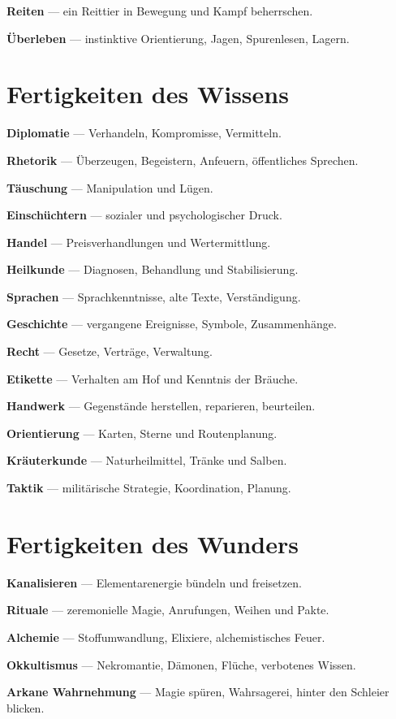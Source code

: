 \documentclass[10pt,a4paper]{article}
\begin{document}
\textbf{Reiten} — ein Reittier in Bewegung und Kampf beherrschen.

\textbf{Überleben} — instinktive Orientierung, Jagen, Spurenlesen, Lagern.

\section*{Fertigkeiten des Wissens}
\textbf{Diplomatie} — Verhandeln, Kompromisse, Vermitteln.

\textbf{Rhetorik} — Überzeugen, Begeistern, Anfeuern, öffentliches Sprechen.

\textbf{Täuschung} — Manipulation und Lügen.

\textbf{Einschüchtern} — sozialer und psychologischer Druck.

\textbf{Handel} — Preisverhandlungen und Wertermittlung.

\textbf{Heilkunde} — Diagnosen, Behandlung und Stabilisierung.

\textbf{Sprachen} — Sprachkenntnisse, alte Texte, Verständigung.

\textbf{Geschichte} — vergangene Ereignisse, Symbole, Zusammenhänge.

\textbf{Recht} — Gesetze, Verträge, Verwaltung.

\textbf{Etikette} — Verhalten am Hof und Kenntnis der Bräuche.

\textbf{Handwerk} — Gegenstände herstellen, reparieren, beurteilen.

\textbf{Orientierung} — Karten, Sterne und Routenplanung.

\textbf{Kräuterkunde} — Naturheilmittel, Tränke und Salben.

\textbf{Taktik} — militärische Strategie, Koordination, Planung.

\section*{Fertigkeiten des Wunders}
\textbf{Kanalisieren} — Elementarenergie bündeln und freisetzen.

\textbf{Rituale} — zeremonielle Magie, Anrufungen, Weihen und Pakte.

\textbf{Alchemie} — Stoffumwandlung, Elixiere, alchemistisches Feuer.

\textbf{Okkultismus} — Nekromantie, Dämonen, Flüche, verbotenes Wissen.

\textbf{Arkane Wahrnehmung} — Magie spüren, Wahrsagerei, hinter den Schleier blicken.
\end{document}
